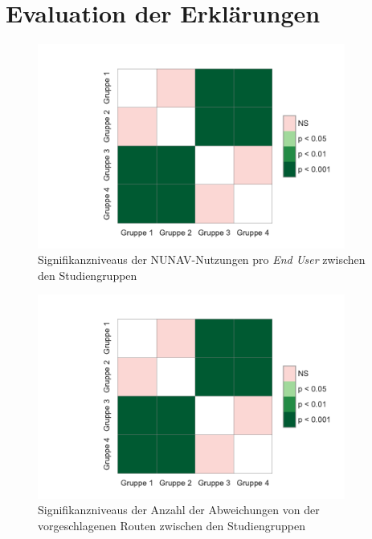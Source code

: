 \newpage

\chapter{Evaluation der Erklärungen}
\label{sec:appendix_study_results}

\begin{figure}[htb!]
    \centering
    \includegraphics[width=0.9\textwidth]{contents/06_model_evaluation/02_evaluation/res/usage_result_significance.pdf}
    \caption{Signifikanzniveaus der NUNAV-Nutzungen pro \textit{End User} zwischen den Studiengruppen}
\end{figure}

\begin{figure}[htb!]
    \centering
    \includegraphics[width=0.9\textwidth]{contents/06_model_evaluation/02_evaluation/res/usage_result_significance.pdf}
    \caption{Signifikanzniveaus der Anzahl der Abweichungen von der vorgeschlagenen Routen zwischen den Studiengruppen}
\end{figure}

